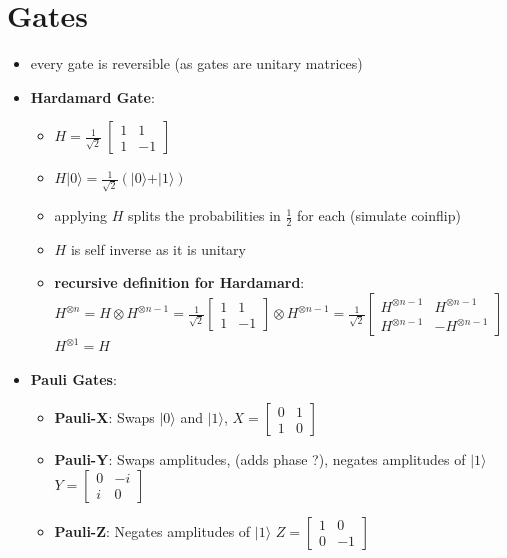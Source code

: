 \documentclass[12pt,a4paper]{article}
\newcommand{\ket}[1]{\vert #1 \rangle}
\begin{document}
\section{Gates}
\begin{itemize}
\item every gate is reversible (as gates are unitary matrices)
\item \textbf{Hardamard Gate}:
\begin{itemize}
\item $H = \frac{1}{\sqrt{2}}\ \begin{bmatrix}1 & 1\\1 & -1 \end{bmatrix}$
\item $H \ket{0} = \frac{1}{\sqrt{2}}(\ket{0}+\ket{1})$
\item applying $H$ splits the probabilities in $\frac{1}{2}$ for each (simulate coinflip)
\item $H$ is self inverse as it is unitary
\item \textbf{recursive definition for Hardamard}:\\
$H^{\otimes n} = H \otimes H^{\otimes n-1} = \frac{1}{\sqrt{2}} \begin{bmatrix}1 & 1\\1 & -1 \end{bmatrix} \otimes H^{\otimes n-1} = \frac{1}{\sqrt{2}} \begin{bmatrix}H^{\otimes n-1} & H^{\otimes n-1}\\H^{\otimes n-1} & -H^{\otimes n-1} \end{bmatrix}$\\
$H^{\otimes 1} = H$
\end{itemize}
\item \textbf{Pauli Gates}:
\begin{itemize}
\item \textbf{Pauli-X}: Swaps $\ket{0}$ and $\ket{1}$, $X = \begin{bmatrix}0 & 1\\1 & 0 \end{bmatrix}$
\item \textbf{Pauli-Y}: Swaps amplitudes, (adds phase ?), negates amplitudes of $\ket{1}$ $Y = \begin{bmatrix}0 & -i\\i & 0 \end{bmatrix}$
\item \textbf{Pauli-Z}: Negates amplitudes of $\ket{1}$ $Z = \begin{bmatrix}1 & 0\\0 & -1 \end{bmatrix}$
\end{itemize}


\end{itemize}
\end{document}
